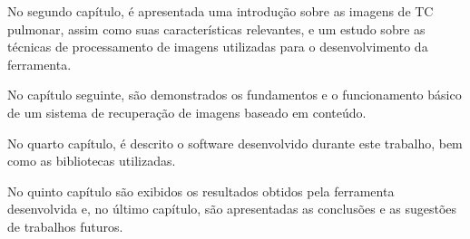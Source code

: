 No segundo capítulo, é apresentada uma introdução sobre as imagens de TC pulmonar, assim como suas características relevantes, e um estudo sobre as técnicas de processamento de imagens utilizadas para o desenvolvimento da ferramenta.

No capítulo seguinte, são demonstrados os fundamentos e o funcionamento básico de um sistema de recuperação de imagens baseado em conteúdo.

No quarto capítulo, é descrito o software desenvolvido durante este trabalho, bem como as bibliotecas utilizadas.

No quinto capítulo são exibidos os resultados obtidos pela ferramenta desenvolvida e, no último capítulo, são apresentadas as conclusões e as sugestões de trabalhos futuros.
